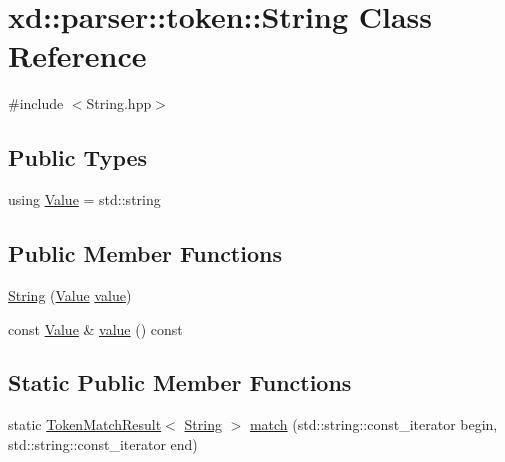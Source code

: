 \hypertarget{classxd_1_1parser_1_1token_1_1_string}{}\section{xd\+:\+:parser\+:\+:token\+:\+:String Class Reference}
\label{classxd_1_1parser_1_1token_1_1_string}


{\ttfamily \#include $<$String.\+hpp$>$}

\subsection*{Public Types}
\begin{DoxyCompactItemize}
\item 
using \mbox{\hyperlink{classxd_1_1parser_1_1token_1_1_string_a32f8a1104e17222ee386be2b7a621e3a}{Value}} = std\+::string
\end{DoxyCompactItemize}
\subsection*{Public Member Functions}
\begin{DoxyCompactItemize}
\item 
\mbox{\hyperlink{classxd_1_1parser_1_1token_1_1_string_a3fc10259ecaefd73e71a13a3b1f6c5e1}{String}} (\mbox{\hyperlink{classxd_1_1parser_1_1token_1_1_string_a32f8a1104e17222ee386be2b7a621e3a}{Value}} \mbox{\hyperlink{classxd_1_1parser_1_1token_1_1_string_ad376517a8ef62e7bc5fb04b67eb890cc}{value}})
\item 
const \mbox{\hyperlink{classxd_1_1parser_1_1token_1_1_string_a32f8a1104e17222ee386be2b7a621e3a}{Value}} \& \mbox{\hyperlink{classxd_1_1parser_1_1token_1_1_string_ad376517a8ef62e7bc5fb04b67eb890cc}{value}} () const
\end{DoxyCompactItemize}
\subsection*{Static Public Member Functions}
\begin{DoxyCompactItemize}
\item 
static \mbox{\hyperlink{namespacexd_1_1parser_1_1token_a766c52bbfb7cb1f08498ef0bb9ec756e}{Token\+Match\+Result}}$<$ \mbox{\hyperlink{classxd_1_1parser_1_1token_1_1_string}{String}} $>$ \mbox{\hyperlink{classxd_1_1parser_1_1token_1_1_string_a9ac1a9b001f9f94b0e44dd1ccfaaa73c}{match}} (std\+::string\+::const\+\_\+iterator begin, std\+::string\+::const\+\_\+iterator end)
\end{DoxyCompactItemize}


